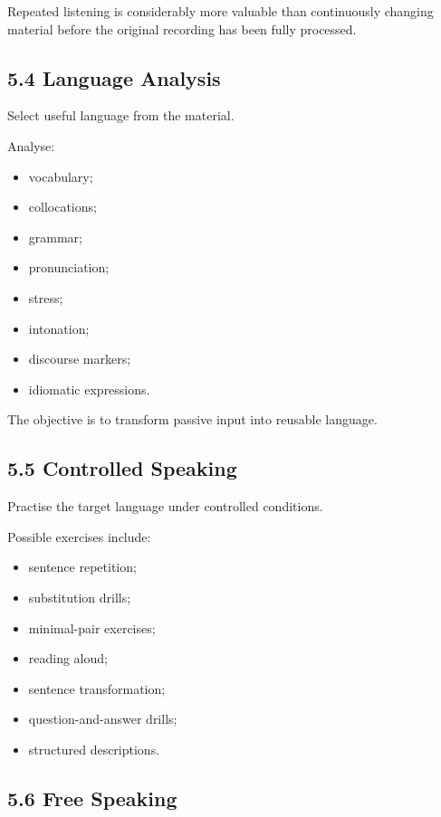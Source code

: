 Repeated listening is considerably more valuable than continuously changing material before the original recording has been fully processed.

\subsection*{5.4 Language Analysis}

Select useful language from the material.

Analyse:

\begin{itemize}
    \item vocabulary;
    \item collocations;
    \item grammar;
    \item pronunciation;
    \item stress;
    \item intonation;
    \item discourse markers;
    \item idiomatic expressions.
\end{itemize}

The objective is to transform passive input into reusable language.

\subsection*{5.5 Controlled Speaking}

Practise the target language under controlled conditions.

Possible exercises include:

\begin{itemize}
    \item sentence repetition;
    \item substitution drills;
    \item minimal-pair exercises;
    \item reading aloud;
    \item sentence transformation;
    \item question-and-answer drills;
    \item structured descriptions.
\end{itemize}

\subsection*{5.6 Free Speaking}

